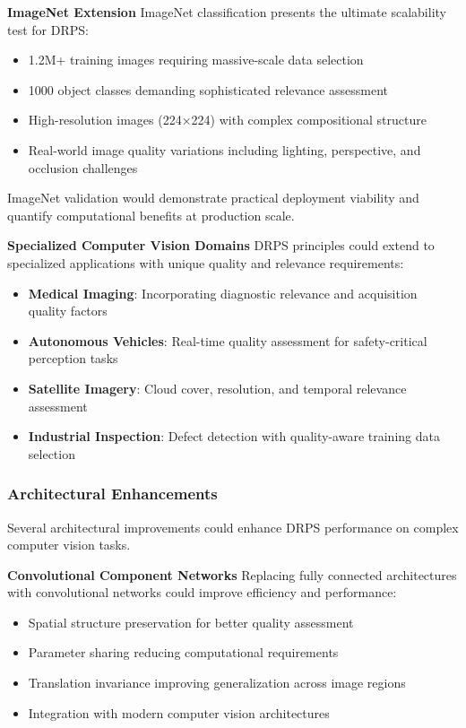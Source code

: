 \documentclass[12pt]{article}
\begin{document}
\textbf{ImageNet Extension}
ImageNet classification presents the ultimate scalability test for DRPS:
\begin{itemize}
\item 1.2M+ training images requiring massive-scale data selection
\item 1000 object classes demanding sophisticated relevance assessment
\item High-resolution images (224×224) with complex compositional structure
\item Real-world image quality variations including lighting, perspective, and occlusion challenges
\end{itemize}

ImageNet validation would demonstrate practical deployment viability and quantify computational benefits at production scale.

\textbf{Specialized Computer Vision Domains}
DRPS principles could extend to specialized applications with unique quality and relevance requirements:

\begin{itemize}
\item \textbf{Medical Imaging}: Incorporating diagnostic relevance and acquisition quality factors
\item \textbf{Autonomous Vehicles}: Real-time quality assessment for safety-critical perception tasks
\item \textbf{Satellite Imagery}: Cloud cover, resolution, and temporal relevance assessment
\item \textbf{Industrial Inspection}: Defect detection with quality-aware training data selection
\end{itemize}

\subsubsection{Architectural Enhancements}\label{architectural-enhancements}

Several architectural improvements could enhance DRPS performance on complex computer vision tasks.

\textbf{Convolutional Component Networks}
Replacing fully connected architectures with convolutional networks could improve efficiency and performance:
\begin{itemize}
\item Spatial structure preservation for better quality assessment
\item Parameter sharing reducing computational requirements
\item Translation invariance improving generalization across image regions
\item Integration with modern computer vision architectures
\end{itemize}
\end{document}
